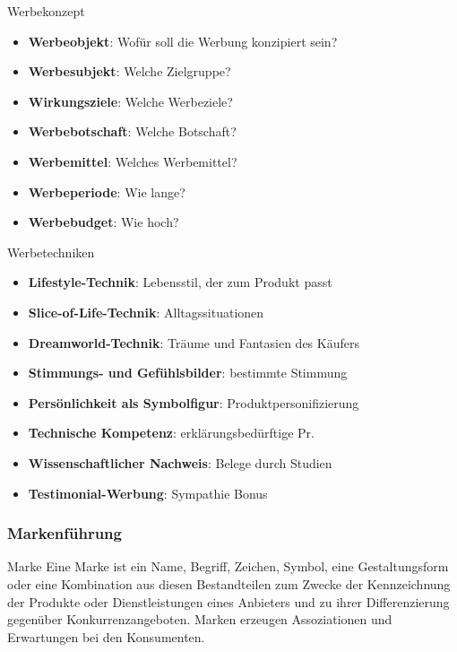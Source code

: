 \begin{definition}{Werbekonzept}
\begin{itemize}
    \item \textbf{Werbeobjekt}: Wofür soll die Werbung konzipiert sein?
    \item \textbf{Werbesubjekt}: Welche Zielgruppe?
    \item \textbf{Wirkungsziele}: Welche Werbeziele?
    \item \textbf{Werbebotschaft}: Welche Botschaft?
    \item \textbf{Werbemittel}: Welches Werbemittel?
    \item \textbf{Werbeperiode}: Wie lange?
    \item \textbf{Werbebudget}: Wie hoch?
\end{itemize}
\end{definition}

\begin{definition}{Werbetechniken}
\begin{itemize}
    \item \textbf{Lifestyle-Technik}: Lebensstil, der zum Produkt passt
    \item \textbf{Slice-of-Life-Technik}: Alltagssituationen
    \item \textbf{Dreamworld-Technik}: Träume und Fantasien des Käufers
    \item \textbf{Stimmungs- und Gefühlsbilder}: bestimmte Stimmung
    \item \textbf{Persönlichkeit als Symbolfigur}: Produktpersonifizierung
    \item \textbf{Technische Kompetenz}: erklärungsbedürftige Pr.
    \item \textbf{Wissenschaftlicher Nachweis}: Belege durch Studien
    \item \textbf{Testimonial-Werbung}: Sympathie Bonus
\end{itemize}
\end{definition}

\multend



\raggedcolumns

\subsubsection{Markenführung}



\begin{definition}{Marke}
Eine Marke ist ein Name, Begriff, Zeichen, Symbol, eine Gestaltungsform oder eine Kombination aus diesen Bestandteilen zum Zwecke der Kennzeichnung der Produkte oder Dienstleistungen eines Anbieters und zu ihrer Differenzierung gegenüber Konkurrenzangeboten. Marken erzeugen Assoziationen und Erwartungen bei den Konsumenten.
\end{definition}

